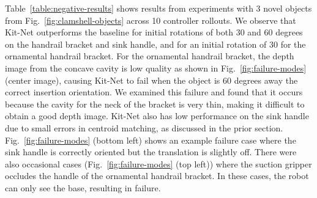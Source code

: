 Table~\ref{table:negative-results} shows results from experiments with 3 novel objects from Fig.~\ref{fig:clamshell-objects} across 10 controller rollouts. We observe that Kit-Net outperforms the baseline for initial rotations of both 30 and 60 degrees on the handrail bracket and sink handle, and for an initial rotation of 30 \degree for the ornamental handrail bracket. For the ornamental handrail bracket, the depth image from the concave cavity is low quality as shown in Fig.~\ref{fig:failure-modes} (center image), causing Kit-Net to fail when the object is 60 degrees away the correct insertion orientation. We examined this failure and found that it occurs because the cavity for the neck of the bracket is very thin, making it difficult to obtain a good depth image. Kit-Net also has low performance on the sink handle due to small errors in centroid matching, as discussed in the prior section. Fig.~\ref{fig:failure-modes} (bottom left) shows an example failure case where the sink handle is correctly oriented but the translation is slightly off. There were also occasional cases (Fig.~\ref{fig:failure-modes} (top left)) where the suction gripper occludes the handle of the ornamental handrail bracket. In these cases, the robot can only see the base, resulting in failure.


